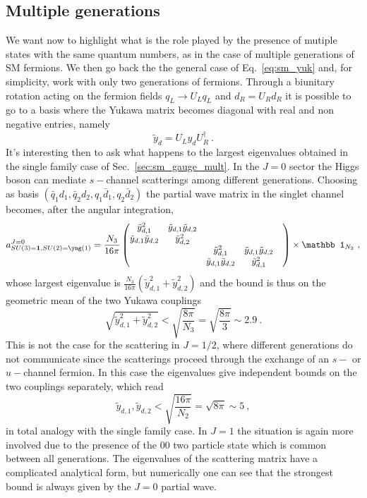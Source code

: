 \documentclass[a4paper,11pt]{article}
\newcommand{\be}{\begin{equation}}
\newcommand{\ee}{\end{equation}}
\begin{document}
\subsection{Multiple generations}

We want now to highlight what is the role played by the presence of mutiple states with the same quantum numbers, as in the case of multiple generations of SM fermions. We then go back the the general case of Eq.~\eqref{eq:sm_yuk} and, for simplicity, work with only two generations of fermions. Through a biunitary rotation acting on the fermion fields $q_L \to U_L q_L$ and  $d_R = U_R d_R$ it is possible to go to a basis where the Yukawa matrix becomes diagonal with real and non negative entries, namely
\be
\tilde y_d = U_L y_d U_R^\dag \ .
\ee
It's interesting then to ask what happens to the largest eigenvalues obtained in the single family case of Sec.~\ref{sec:sm_gauge_mult}. In the $J=0$ sector the Higgs boson can mediate $s-$channel scatterings among different generations. Choosing as basis $(\bar q_1 d_1,\bar q_2 d_2, q_1 \bar d_1, q_2 \bar d_2)$ the partial wave matrix in the singlet channel becomes, after the angular integration,
\be
a^{J=0}_{SU(3)={\bf 1}, SU(2)= {\tiny{\yng(1)}}}=\frac{ N_3}{16\pi}
\begin{pmatrix}
\tilde{y}_{d,1}^2 & \tilde{y}_{d,1} \tilde{y}_{d,2} & & \\
  \tilde{y}_{d,1} \tilde{y}_{d,2} & \tilde{y}_{d,2}^2& & \\
& & \tilde{y}_{d,1}^2 & \tilde{y}_{d,1} \tilde{y}_{d,2}  \\
& & \tilde{y}_{d,1} \tilde{y}_{d,2} & \tilde{y}_{d,1}^2 &   \\
\end{pmatrix}
\times
 {\mathbb 1}_{N_2} \ ,
\ee
%
whose largest eigenvalue is $\frac{N_3}{16\pi} (\tilde{y}_{d,1}^2+\tilde{y}_{d,2}^2)$ and the bound is thus on the geometric mean of the two Yukawa couplings
\be
\sqrt{\tilde y_{d,1}^2+\tilde y_{d,2}^2} < \sqrt{\frac{8\pi}{N_3}} = \sqrt{\frac{8\pi}{3}} \sim 2.9 \ .
\ee
This is not the case for the scattering in $J=1/2$, where different generations do not communicate since the scatterings proceed through the exchange of an $s-$ or $u-$channel fermion. 
In this case the eigenvalues give independent bounds on the two couplings separately, which read 
\be
\label{eq:2generations}
\tilde y_{d,1},\tilde y_{d,2} < \sqrt{\frac{16\pi}{N_2}} = \sqrt{8 \pi} \sim 5 \ ,
\ee
in total analogy with the single family case. In $J=1$ the situation is again more involved due to the presence of the $00$ two particle state which
is common between all generations. The eigenvalues of the scattering matrix have a complicated analytical form, but numerically one can see that the strongest bound is always given by the $J=0$ partial wave.
\end{document}
